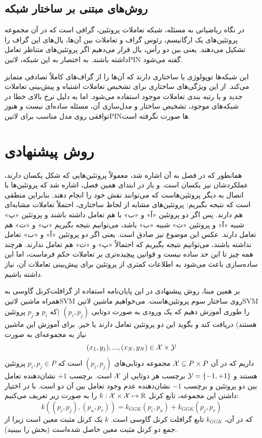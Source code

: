 \subsection{روش‌های مبتنی بر ساختار شبکه}
در نگاه ریاضیاتی به مسئله، شبکه تعاملات پروتئین، گرافی است که در آن مجموعه
پروتئین‌های یک ارگانیسم، رئوس گراف و تعاملات بین آن‌ها، یال‌های این گراف را تشکیل می‌دهند. یعنی بین دو رأس، یال قرار می‌دهیم اگر پروتئین‌های متناظر تعامل داشته باشند. به اختصار به این شبکه‌، ‌لاتین{PIN} گفته می‌شود.

این شبکه‌ها توپولوژی یا ساختاری دارند که آن‌ها را از گراف‌های کاملاً تصادفی متمایز می‌کند. از این ویژگی‌های ساختاری برای تشخیص تعاملات اشتباه و پیش‌بینی تعاملات جدید و یا رتبه بندی تعاملات موجود استفاده می‌شود. اما به دلیل نرخ بالای خطا در شبکه‌های موجود، تشخیص ساختار و مدل‌سازی آن، مسئله ساده‌ای نیست و هنوز توافقی روی مدل مناسب برای ‌لاتین{PIN}ها صورت نگرفته است.

\section{روش پیشنهادی}
همانطور که در فصل  به آن اشاره شد، معمولاً پروتئین‌هایی که شکل یکسان دارند، عملکردشان نیز یکسان است. و باز در ابتدای همین فصل، اشاره شد که پروتئین‌ها با اتصال به دیگر پروتئین‌هاست که می‌توانند نقش خود را انجام دهند. بنابراین منطقی است که نتیجه بگیریم: پروتئین‌های مشابه از لحاظ ساختاری، احتملاً تعاملات مشابه‌ای هم دارند. پس اگر دو پروتئین «آ» و «ب» با هم تعامل داشته باشند و پروتئین «پ» شبیه «آ» و پروتئین «ت» شبیه «ب» باشد، می‌توانیم نتیجه بگیریم «پ» و «ت» هم تعامل دارند. عکس این موضوع نیز صادق است. یعنی اگر دو پروتئین «آ» و «ب» تعامل نداشته باشند، می‌توانیم نتیجه بگیریم که احتمالاً «پ» و «ت» هم تعامل ندارند. هرچند همه چیز تا این حد ساده نیست و قوانین پیچیده‌تری بر تعاملات حکم فرماست، اما این ساده‌سازی باعث می‌شود به اطلاعات کمتری از پروتئین برای پیش‌بینی تعاملات آن، نیاز داشته باشیم.

بر همین مبنا، روش پیشنهادی در این پایان‌نامه استفاده از گرافلت‌کرنل گاوسی به همراه ماشین ‌لاتین{SVM} روی ساختار سوم پروتئین‌هاست. می‌خواهیم ماشین ‌لاتین{SVM} را طوری آموزش دهیم که یک ورودی به صورت دوتایی $(p_i,p_j)$ (که $p_i$ و $p_j$ پروتئین هستند) دریافت کند و بگوید این دو پروتئین تعامل دارند یا خیر. برای آموزش این ماشین نیاز به مجموعه‌ای به صورت
\begin{equation*}
(x_1,y_1),...,(x_N,y_N) \in \mathcal{X} \times \mathcal{Y}
\end{equation*}
داریم که در آن $\mathcal{X} \subseteq P\times P$ مجموعه دوتایی‌های $(p_i,p_j)$ است که $p_i,p_j \in P$ پروتئین هستند و  $\mathcal{Y} = \left\lbrace-1,+1 \right\rbrace$ برچسب هر دوتایی از $\mathcal{X}$ است. برچسب $+1$ نشان‌دهنده تعامل بین دو پروتئین و برچسب $-1$ نشان‌دهنده عدم وجود تعامل بین آن دو است. با در اختیار داشتن این مجموعه، تابع کرنل $k: \mathcal{X}\times \mathcal{X} \mapsto \mathbb{R}$ را به صورت زیر تعریف می‌کنیم:
\begin{equation*}
k((p_i,p_j),(p_u,p_v)) = k_{GGK}(p_i,p_u) + k_{GGK}(p_j,p_v)
\end{equation*}
که در آن، $k_{GGK}$ تابع گرافلت کرنل گاوسی است. $k$ یک کرنل مثبت معین است زیرا از جمع دو کرنل مثبت معین حاصل شده‌است (بخش  را ببینید).

